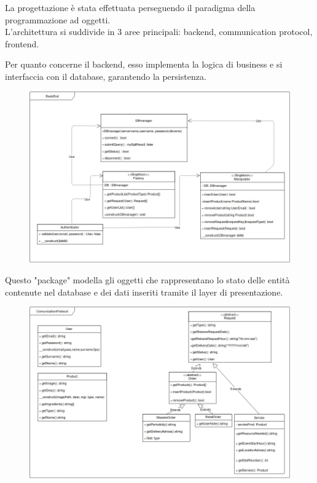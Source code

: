 La progettazione è stata effettuata perseguendo il paradigma della programmazione ad oggetti.\\
L'architettura si suddivide in 3 aree principali: backend, communication protocol, frontend.

Per quanto concerne il backend, esso implementa la logica di business e si interfaccia con il database, garantendo la persistenza.

\begin{figure}[h!]
	\includegraphics[width=1\linewidth]{StyleLatex/PHP_backend.jpg}
\end{figure}

\newpage

Questo "package" modella gli oggetti che rappresentano lo stato delle entità contenute nel database e dei dati inseriti tramite il layer di presentazione.

\begin{figure}[h!]
	\includegraphics[width=1\linewidth]{StyleLatex/PHP_comunication_protocol.jpg}
\end{figure}



